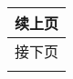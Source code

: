 \documentclass{article}
\begin{document}
\begin{center}
    \begin{longtable}{c|c|cc}
        \hline
        \endfirsthead


        \hline \multicolumn{4}{r}{{续上页}}                                                                                                                \\ \hline
        \endhead

        \hline \multicolumn{4}{r}{{接下页}}                                                                                                                \\ \hline
        \endfoot

        \hline
        \endlastfoot


\end{longtable}
\end{center}
\end{document}
